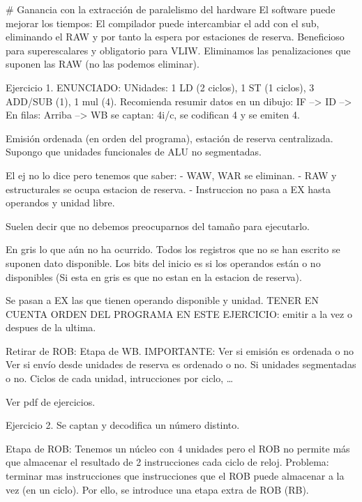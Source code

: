 # Ganancia con la extracción de paralelismo del hardware
El software puede mejorar los tiempos:
El compilador puede intercambiar el add con el sub, eliminando el RAW y por tanto la espera por estaciones de reserva.
Beneficioso para superescalares y obligatorio para VLIW. Eliminamos las penalizaciones que suponen las RAW (no las podemos eliminar).






% 
% 
% 
% 
% 









Ejercicio 1. ENUNCIADO:
UNidades: 1 LD (2 ciclos), 1 ST (1 ciclos), 3 ADD/SUB (1), 1 mul (4).
Recomienda resumir datos en un dibujo:
IF --> ID --> En filas: Arriba --> WB
se captan: 4i/c, se codifican 4 y se emiten 4.

Emisión ordenada (en orden del programa), estación de reserva centralizada.
Supongo que unidades funcionales de ALU no segmentadas.

El ej no lo dice pero tenemos que saber:
- WAW, WAR se eliminan.
- RAW y estructurales se ocupa estacion de reserva.
- Instruccion no pasa a EX hasta operandos y unidad libre.

Suelen decir que no debemos preocuparnos del tamaño para ejecutarlo.

En gris lo que aún no ha ocurrido.
Todos los registros que no se han escrito se suponen dato disponible.
Los bits del inicio es si los operandos están o no disponibles (Si esta en gris es que no estan en la estacion de reserva).



Se pasan a EX las que tienen operando disponible y unidad.
TENER EN CUENTA ORDEN DEL PROGRAMA EN ESTE EJERCICIO: emitir a la vez o despues de la ultima.


Retirar de ROB: Etapa de WB.
IMPORTANTE: 
    Ver si emisión es ordenada o no
    Ver si envío desde unidades de reserva es ordenado o no.
    Si unidades segmentadas o no.
    Ciclos de cada unidad, intrucciones por ciclo, \ldots


Ver pdf de ejercicios.

Ejercicio 2.
Se captan y decodifica un número distinto.

Etapa de ROB:
    Tenemos un núcleo con 4 unidades pero el ROB no permite más que almacenar el resultado de 2 instrucciones cada ciclo de reloj.
    Problema: terminar mas instrucciones que instrucciones que el ROB puede almacenar a la vez (en un ciclo).
    Por ello, se introduce una etapa extra de ROB (RB). 
